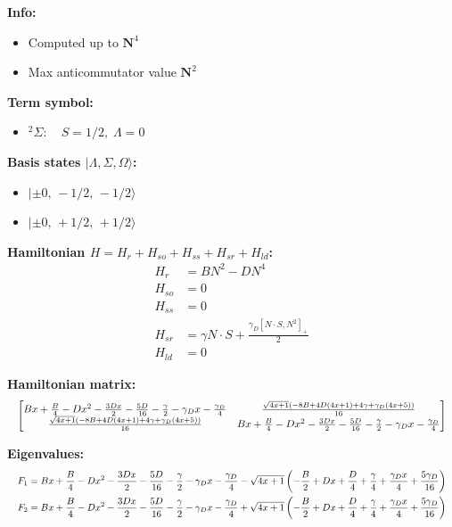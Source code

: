 \documentclass[12pt,fleqn]{article}
\begin{document}
\pagestyle{empty}

\textbf{Info:}
\begin{itemize}
\item Computed up to $\bm{N}^4$
\item Max anticommutator value $\bm{N}^2$
\end{itemize}

\textbf{Term symbol:}
\begin{itemize}
\item $^2\Sigma:\quad S=1/2,\;\Lambda=0$
\end{itemize}

\textbf{Basis states $\lvert \Lambda,\Sigma,\Omega\rangle$:}
\begin{itemize}
\item $\lvert \pm0,\,-1/2,\,-1/2\rangle$
\item $\lvert \pm0,\,+1/2,\,+1/2\rangle$
\end{itemize}

\textbf{Hamiltonian $H = H_r + H_{so} + H_{ss} + H_{sr} + H_{ld}$:}
\begin{equation*}
\begin{aligned}
H_r &= B N^{2} - D N^{4} \\
H_{so} &= 0 \\
H_{ss} &= 0 \\
H_{sr} &= \gamma N \cdot S + \frac{\gamma_{D} \left[N \cdot S, N^{2}\right]_+}{2} \\
H_{ld} &= 0
\end{aligned}
\end{equation*}

\textbf{Hamiltonian matrix:}
\begin{equation*}
\resizebox{\linewidth}{!}{$
\left[\begin{matrix}B x + \frac{B}{4} - D x^{2} - \frac{3 D x}{2} - \frac{5 D}{16} - \frac{\gamma}{2} - \gamma_{D} x - \frac{\gamma_{D}}{4} & \frac{\sqrt{4 x + 1} \left(- 8 B + 4 D \left(4 x + 1\right) + 4 \gamma + \gamma_{D} \left(4 x + 5\right)\right)}{16}\\\frac{\sqrt{4 x + 1} \left(- 8 B + 4 D \left(4 x + 1\right) + 4 \gamma + \gamma_{D} \left(4 x + 5\right)\right)}{16} & B x + \frac{B}{4} - D x^{2} - \frac{3 D x}{2} - \frac{5 D}{16} - \frac{\gamma}{2} - \gamma_{D} x - \frac{\gamma_{D}}{4}\end{matrix}\right]
$}
\end{equation*}

\textbf{Eigenvalues:}
\begin{equation*}
\resizebox{\linewidth}{!}{$
\begin{aligned}
F_{1} &= B x + \frac{B}{4} - D x^{2} - \frac{3 D x}{2} - \frac{5 D}{16} - \frac{\gamma}{2} - \gamma_{D} x - \frac{\gamma_{D}}{4} - \sqrt{4 x + 1} \left(- \frac{B}{2} + D x + \frac{D}{4} + \frac{\gamma}{4} + \frac{\gamma_{D} x}{4} + \frac{5 \gamma_{D}}{16}\right) \\
F_{2} &= B x + \frac{B}{4} - D x^{2} - \frac{3 D x}{2} - \frac{5 D}{16} - \frac{\gamma}{2} - \gamma_{D} x - \frac{\gamma_{D}}{4} + \sqrt{4 x + 1} \left(- \frac{B}{2} + D x + \frac{D}{4} + \frac{\gamma}{4} + \frac{\gamma_{D} x}{4} + \frac{5 \gamma_{D}}{16}\right) \\
\end{aligned}
$}
\end{equation*}
\end{document}
